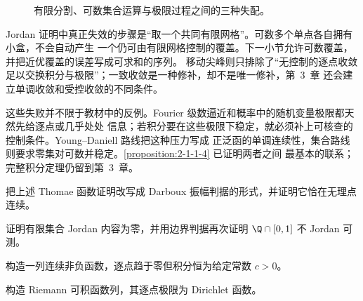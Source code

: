 \begin{figure}[htbp]
\centering
{}
\caption{有限分割、可数集合运算与极限过程之间的三种失配。}
\label{fig:jordan-lebesgue-daniell-failures}
\end{figure}

\begin{remark}
Jordan 证明中真正失效的步骤是“取一个共同有限网格”。可数多个单点各自拥有小盒，不会自动产生
一个仍可由有限网格控制的覆盖。下一小节允许可数覆盖，并把近优覆盖的误差写成可求和的序列。
移动尖峰则只排除了“无控制的逐点收敛足以交换积分与极限”；一致收敛是一种修补，却不是唯一修补，第~3~章
还会建立单调收敛和受控收敛的不同条件。
\end{remark}

这些失败并不限于教材中的反例。Fourier 级数逼近和概率中的随机变量极限都天然先给逐点或几乎处处
信息；若积分要在这些极限下稳定，就必须补上可核查的控制条件。Young--Daniell 路线把这种压力写成
正泛函的单调连续性，集合路线则要求零集对可数并稳定。\cref{proposition:2-1-1-4} 已证明两者之间
最基本的联系；完整积分定理仍留到第~3~章。

\begin{exercise}
把上述 Thomae 函数证明改写成 Darboux 振幅判据的形式，并证明它恰在无理点连续。
\end{exercise}
\begin{exercise}
证明有限集合 Jordan 内容为零，并用边界判据再次证明 $\Q\cap[0,1]$ 不 Jordan 可测。
\end{exercise}
\begin{exercise}
构造一列连续非负函数，逐点趋于零但积分恒为给定常数 $c>0$。
\end{exercise}
\begin{exercise}
构造 Riemann 可积函数列，其逐点极限为 Dirichlet 函数。
\end{exercise}

